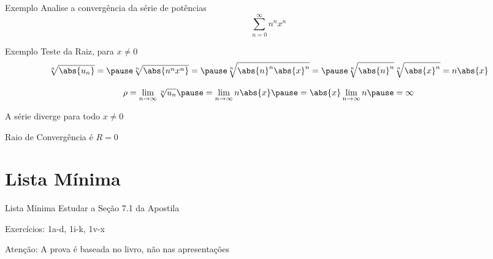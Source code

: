 \addtocounter{exemplo}{1}
\begin{frame}{Exemplo \theexemplo}
  Analise a convergência da série de potências
  \[
    \sum_{n=0}^\infty n^n x^n
  \]
\end{frame}

\begin{frame}{Exemplo \theexemplo}
  Teste da Raiz, para \(x\neq 0\)
  \pause
  \[
    \sqrt[n]{\abs{u_n}} =
    \pause
    \sqrt[n]{\abs{n^nx^n}} =
    \pause
    \sqrt[n]{\abs{n}^n\abs{x}^n} =
    \pause
    \sqrt[n]{\abs{n}^n} \sqrt[n]{\abs{x}^n} =
    n\abs{x}
  \]

  \pause
  \[
    \rho
    = \lim_{n\to\infty} \sqrt[n]{u_n}
    \pause
    = \lim_{n\to\infty} n\abs{x}
    \pause
    = \abs{x} \lim_{n\to\infty} n
    \pause
    = \infty
  \]

  \pause
  \vspace{0.7\baselineskip}
  A série diverge para todo \(x\neq 0\)

  \pause
  \vspace{0.5\baselineskip}
  Raio de Convergência é $R=0$
\end{frame}

\section{Lista Mínima}

\begin{frame}{Lista Mínima}
  Estudar a Seção 7.1 da Apostila

  \vspace{\baselineskip}
  Exercícios: 1a-d, 1i-k, 1v-x

  \vfill
  Atenção: A prova é baseada no livro, não nas apresentações
\end{frame}


